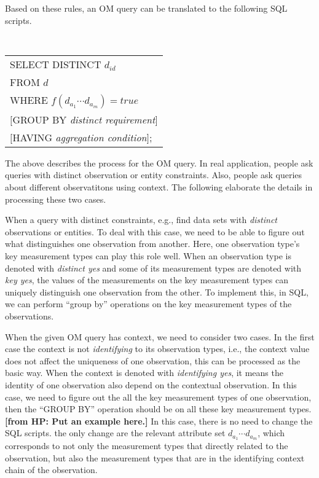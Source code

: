 \documentclass[conference]{IEEEtran}
\newcommand{\from}[2]{{\bf[{\sc from #1:} #2]}}
\begin{document}
Based on these rules, an OM query can be translated to the following
SQL scripts. 

\vspace{0.1in}
{\tt 
\begin{tabular}{l} 
SELECT DISTINCT $d_{id}$\\
FROM $d$\\
WHERE $f(d_{a_1} \cdots d_{a_m}) = true$\\
$[$GROUP BY {\em distinct requirement}$]$\\
$[$HAVING {\em aggregation condition}$]$;
\end{tabular}
}
\vspace{0.1in}

The above describes the process for the OM query. 
In real application, people ask queries with distinct
observation or entity constraints. Also, people ask queries about
different observatitons using context. 
The following elaborate the details in processing these two cases. 

When a query with distinct constraints, e.g., find data sets with {\em distinct} observations or
entities. To deal with this case, 
we need to be able to figure out what distinguishes one observation
from another. Here, one observation type's key measurement types can
play this role well. 
When an observation type is denoted with {\em distinct yes} and some
of its measurement types are denoted with {\em key yes}, 
the values of the measurements on the key measurement types can
uniquely distinguish one observation from the other. 
To implement this, in SQL, we can perform ``group by'' operations on
the key measurement types of the observations. 

When the given OM query has context, we need to consider two cases. 
In the first case the context is not {\em identifying} to its
observation types, i.e., the context value
does not affect the uniqueness of one observation, this can be
processed as the basic way. 
When the context is denoted with {\em identifying yes}, it means the
identity of one observation also depend on the contextual
observation. 
In this case, we need to figure out the all the key measurement types
of one observation, then the ``GROUP BY'' operation should be on all
these key measurement types. 
\from{HP}{Put an example here.}
In this case, there is no need to change the SQL scripts.
the only change are the relevant attribute set $d_{a_1} \cdots
d_{a_m}$, which corresponds to not only the measurement types that
directly related to the observation, but also the measurement types
that are in the identifying context chain of the observation. 
\end{document}
